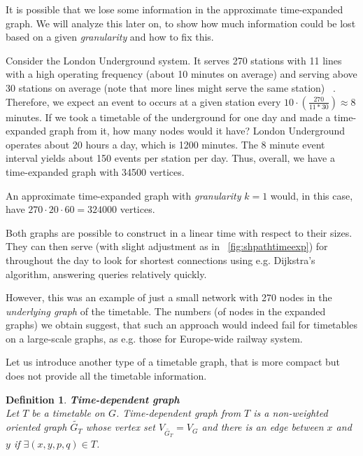\documentclass[a4paper]{article}
\newtheorem{definition}{Definition}
\begin{document}
        \noindent It is possible that we lose some information in the approximate time-expanded graph. %
        We will analyze this later on, to show how much information could be lost based on a given \emph{granularity} and how to fix this. %

        Consider the London Underground system. It serves 270 stations with 11 lines with a high operating frequency (about 10 minutes on average) and serving above 30 stations on average (note that more lines might serve the same station) ~\cite{LondonUnd}. Therefore, we expect an event to occurs at a given station every $10 \cdot (\frac{270}{11 * 30}) \approx 8$ minutes. If we took a timetable of the underground for one day and made a time-expanded graph from it, how many nodes would it have? London Underground operates about 20 hours a day, which is 1200 minutes. The 8 minute event interval yields about 150 events per station per day. Thus, overall, we have a time-expanded graph with 34500 vertices.

        An approximate time-expanded graph with \emph{granularity} $k = 1$ would, in this case, have $270 \cdot 20 \cdot 60 = 324000$ vertices.

        Both graphs are possible to construct in a linear time with respect to their sizes. They can then serve (with slight adjustment as in ~\ref{fig:shpathtimeexp}) for throughout the day to look for shortest connections using e.g. Dijkstra's algorithm, answering queries relatively quickly.

        However, this was an example of just a small network with 270 nodes in the \emph{underlying graph} of the timetable. The numbers (of nodes in the expanded graphs) we obtain suggest, that such an approach would indeed fail for timetables on a large-scale graphs, as e.g. those for Europe-wide railway system.

        Let us introduce another type of a timetable graph, that is more compact but does not provide all the timetable information.

        \begin{definition}
            \textbf{Time-dependent graph} ~\cite{timetablemodelsalgs07} \\
            Let $T$ be a timetable on $G$. Time-dependent graph from $T$ is a non-weighted oriented graph $\widetilde{G_{T}}$ whose vertex set $V_{\widetilde{G_{T}}} = V_{G}$ and there is an edge between $x$ and $y$ if $\exists (x, y, p, q) \in T$.
        \end{definition}
\end{document}
